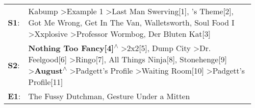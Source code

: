 \begin{supertabular}{p{0.03\textwidth}p{0.92\textwidth}}
 \textbf{S1}:  &                                                                                  Kabump\textsuperscript{} \textgreater \enspace Example 1\textsuperscript{} \textgreater \enspace Last Man Swerving[1]\textsuperscript{}, 's Theme[2]\textsuperscript{}, \enspace Got Me Wrong\textsuperscript{}, \enspace Get In The Van\textsuperscript{}, \enspace Walletsworth\textsuperscript{}, \enspace Soul Food I\textsuperscript{} \textgreater \enspace Xxplosive\textsuperscript{} \textgreater \enspace Professor Wormbog\textsuperscript{}, \enspace Der Bluten Kat[3]\textsuperscript{}  \enspace  \\
 \textbf{S2}:  &  \textbf{Nothing Too Fancy[4]\textsuperscript{$\wedge$}} \textgreater \enspace 2x2[5]\textsuperscript{}, \enspace Dump City\textsuperscript{} \textgreater \enspace Dr. Feelgood[6]\textsuperscript{} \textgreater \enspace Ringo[7]\textsuperscript{}, \enspace All Things Ninja[8]\textsuperscript{}, \enspace Stonehenge[9]\textsuperscript{} \textgreater \enspace \textbf{August\textsuperscript{$\wedge$}} \textgreater \enspace Padgett's Profile\textsuperscript{} \textgreater \enspace Waiting Room[10]\textsuperscript{} \textgreater \enspace Padgett's Profile[11]\textsuperscript{}  \enspace  \\
 \textbf{E1}:  &                                                                                                                                                                                                                                                                                                                                                                                                                                                                                                           The Fussy Dutchman\textsuperscript{}, \enspace Gesture Under a Mitten\textsuperscript{}  \enspace  \\
\end{supertabular}
